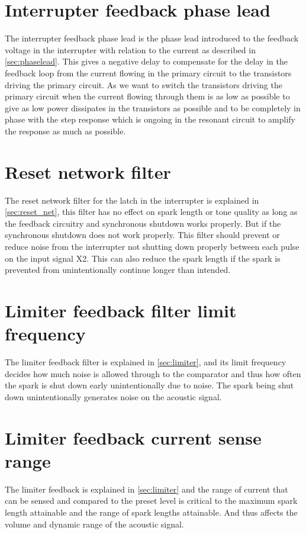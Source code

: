 \section{Interrupter feedback phase lead}
The interrupter feedback phase lead is the phase lead introduced to the feedback voltage in the interrupter with relation to the current as described in \cref{sec:phaselead}. This gives a negative delay to compensate for the delay in the feedback loop from the current flowing in the primary circuit to the transistors driving the primary circuit. As we want to switch the transistors driving the primary circuit when the current flowing through them is as low as possible to give as low power dissipates in the transistors as possible and to be completely in phase with the step response which is ongoing in the resonant circuit to amplify the response as much as possible. 

\section{Reset network filter}
The reset network filter for the latch in the interrupter is explained in \cref{sec:reset_net}, this filter has no effect on spark length or tone quality as long as the feedback circuitry and synchronous shutdown works properly. But if the synchronous shutdown does not work properly. This filter should prevent or reduce noise from the interrupter not shutting down properly between each pulse on the input signal X2. This can also reduce the spark length if the spark is prevented from unintentionally continue longer than intended.

\section{Limiter feedback filter limit frequency}
The limiter feedback filter is explained in \cref{sec:limiter}, and its limit frequency decides how much noise is allowed through to the comparator and thus how often the spark is shut down early unintentionally due to noise. The spark being shut down unintentionally generates noise on the acoustic signal.

\section{Limiter feedback current sense range}
The limiter feedback is explained in \cref{sec:limiter} and the range of current that can be sensed and compared to the preset level is critical to the maximum spark length attainable and the range of spark lengths attainable. And thus affects the volume and dynamic range of the acoustic signal.


